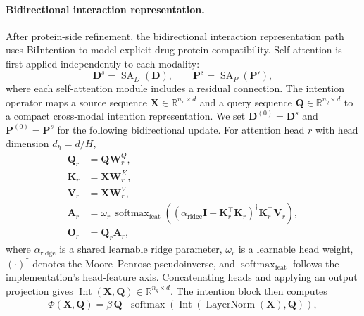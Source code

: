 \paragraph{Bidirectional interaction representation.}
After protein-side refinement, the bidirectional interaction representation path
uses BiIntention to model explicit drug-protein compatibility. Self-attention is
first applied independently to each modality:
\begin{equation}
  \mathbf{D}^{s}=\operatorname{SA}_{D}(\mathbf{D}),\qquad
  \mathbf{P}^{s}=\operatorname{SA}_{P}(\mathbf{P}'),
  \label{eq:bi_self_attention}
\end{equation}
where each self-attention module includes a residual connection. The intention
operator maps a source sequence $\mathbf{X}\in\mathbb{R}^{n_x\times d}$ and a
query sequence $\mathbf{Q}\in\mathbb{R}^{n_q\times d}$ to a compact cross-modal
intention representation. We set $\mathbf{D}^{(0)}=\mathbf{D}^{s}$ and
$\mathbf{P}^{(0)}=\mathbf{P}^{s}$ for the following bidirectional update. For
attention head $r$ with head dimension $d_h=d/H$,
\begin{equation}
\begin{aligned}
  \mathbf{Q}_{r} &= \mathbf{Q}\mathbf{W}^{Q}_{r},\\
  \mathbf{K}_{r} &= \mathbf{X}\mathbf{W}^{K}_{r},\\
  \mathbf{V}_{r} &= \mathbf{X}\mathbf{W}^{V}_{r},\\
  \mathbf{A}_{r} &=
  \omega_r\,
  \operatorname{softmax}_{\mathrm{feat}}
  \left(
    (\alpha_{\mathrm{ridge}}\mathbf{I}+\mathbf{K}_{r}^{\top}\mathbf{K}_{r})^{\dagger}
    \mathbf{K}_{r}^{\top}\mathbf{V}_{r}
  \right),\\
  \mathbf{O}_{r} &= \mathbf{Q}_{r}\mathbf{A}_{r},
\end{aligned}
\label{eq:intention_head}
\end{equation}
where $\alpha_{\mathrm{ridge}}$ is a shared learnable ridge parameter, $\omega_r$
is a learnable head weight, $(\cdot)^{\dagger}$ denotes the Moore--Penrose
pseudoinverse, and $\operatorname{softmax}_{\mathrm{feat}}$ follows the
implementation's head-feature axis.
Concatenating heads and applying an output projection gives
$\operatorname{Int}(\mathbf{X},\mathbf{Q})\in\mathbb{R}^{n_q\times d}$. The
intention block then computes
\begin{equation}
  \Phi(\mathbf{X},\mathbf{Q}) =
  \beta\,
  \mathbf{Q}^{\top}
  \operatorname{softmax}
  \left(
    \operatorname{Int}(\operatorname{LayerNorm}(\mathbf{X}),\mathbf{Q})
  \right),
  \label{eq:intention_block}
\end{equation}
